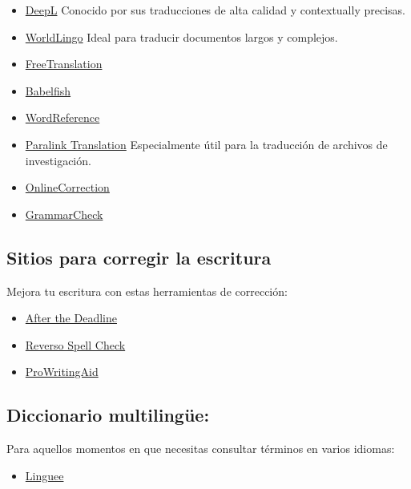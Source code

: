 \documentclass[
  jou,
  floatsintext,
  longtable,
  a4paper,
  nolmodern,
  notxfonts,
  notimes,
  colorlinks=true,linkcolor=blue,citecolor=blue,urlcolor=blue]{apa7}
\providecommand{\tightlist}{%
  \setlength{\itemsep}{0pt}\setlength{\parskip}{0pt}}
\begin{document}
\begin{itemize}
\tightlist
\item
  \href{https://www.deepl.com/es/home}{DeepL} Conocido por sus
  traducciones de alta calidad y contextually precisas.
\item
  \href{http://www.worldlingo.com/}{WorldLingo} Ideal para traducir
  documentos largos y complejos.
\item
  \href{https://www.freetranslation.com/}{FreeTranslation}
\item
  \href{https://www.babelfish.com/}{Babelfish}
\item
  \href{https://www.wordreference.com/}{WordReference}
\item
  \href{https://www.translation2.paralink.com/}{Paralink Translation}
  Especialmente útil para la traducción de archivos de investigación.
\item
  \href{https://www.onlinecorrection.com/}{OnlineCorrection}
\item
  \href{https://www.grammarcheck.net/}{GrammarCheck}
\end{itemize}

\subsection{Sitios para corregir la
escritura}\label{sitios-para-corregir-la-escritura}

Mejora tu escritura con estas herramientas de corrección:

\begin{itemize}
\tightlist
\item
  \href{http://www.afterthedeadline.com/}{After the Deadline}
\item
  \href{http://www.reverso.net/spell-chec/english-spelling-grammar/}{Reverso
  Spell Check}
\item
  \href{https://prowritingaid.com/}{ProWritingAid}
\end{itemize}

\subsection{Diccionario multilingüe:}\label{diccionario-multilinguxfce}

Para aquellos momentos en que necesitas consultar términos en varios
idiomas:

\begin{itemize}
\tightlist
\item
  \href{https://www.linguee.es/}{Linguee}
\end{itemize}
\end{document}
